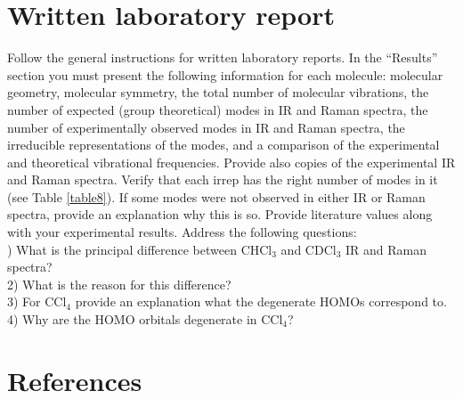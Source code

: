 \documentclass[byrevtex,amssymb,aps,pra,floatfix,letterpaper]{revtex4}
\begin{document}
\section{Written laboratory report}

Follow the general instructions for written laboratory reports. In the  ``Results'' section you must present the following information for each molecule: molecular geometry, molecular symmetry, the total number of molecular vibrations, the number of expected (group theoretical) modes in IR and Raman spectra, the number of experimentally observed modes in IR and Raman spectra, the irreducible representations of the modes, and a comparison of the experimental and theoretical vibrational frequencies. Provide also copies of 
the experimental IR and Raman spectra. Verify that each irrep has the right number of modes in it (see Table \ref{table8}). If some modes were not observed in either IR or Raman spectra, provide an explanation why this is so. Provide  literature values along with your experimental results. Address the following questions:\\

) What is the principal difference between CHCl$_3$ and CDCl$_3$ IR and Raman
spectra?\\
2) What is the reason for this difference?\\
3) For CCl$_4$ provide an explanation what the degenerate HOMOs correspond to.\\
4) Why are the HOMO orbitals degenerate in CCl$_4$?\\

\section{References}


\end{document}
